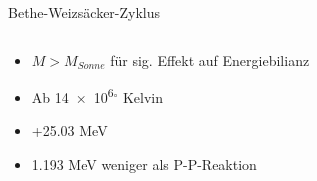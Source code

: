 \documentclass[aspectratio=169,xcolor=dvipsnames,14pt]{beamer}
\begin{document}
{\begin{frame}{Bethe-Weizsäcker-Zyklus}
\begin{columns}
            \begin{column}{0.3\textwidth}
                \begin{itemize}
                    \color{LightGrey}
                    \item \begin{math} M > M_{Sonne} \end{math} für sig. Effekt auf Energiebilianz
                    \item Ab \num{14e6}$^{\circ}$ Kelvin
                    \item +\num{25.03} MeV
                    \item \num{1.193} MeV weniger als P-P-Reaktion
                \end{itemize}
            \end{column}
        \end{columns}
    \end{frame}
    }
\end{document}
